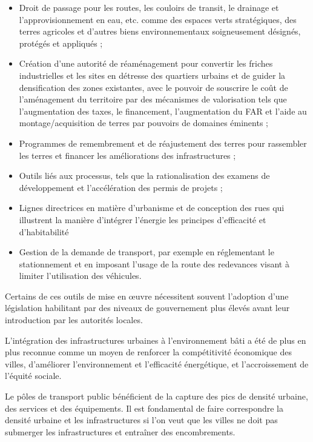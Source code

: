 \begin{itemize}
\item Droit de passage pour les routes, les couloirs de transit, le drainage et l'approvisionnement en eau, etc.
comme des espaces verts stratégiques, des terres agricoles et d'autres biens environnementaux soigneusement
désignés, protégés et appliqués ;
\item Création d'une autorité de réaménagement pour convertir les friches industrielles et les sites en détresse
des quartiers urbains et de guider la densification des zones existantes, avec le pouvoir de souscrire
le coût de l'aménagement du territoire par des mécanismes de valorisation tels que l'augmentation des taxes,
le financement, l'augmentation du FAR et l'aide au montage/acquisition de terres par
pouvoirs de domaines éminents ;
\item Programmes de remembrement et de réajustement des terres pour rassembler les terres et financer les
améliorations des infrastructures ;
\item Outils liés aux processus, tels que la rationalisation des examens de développement et l'accélération
des permis de projets ;
\item Lignes directrices en matière d'urbanisme et de conception des rues qui illustrent la manière d'intégrer l'énergie
les principes d'efficacité et d'habitabilité
\item Gestion de la demande de transport, par exemple en réglementant le stationnement et en imposant l'usage de la route
des redevances visant à limiter l'utilisation des véhicules.

\end{itemize}

Certains de ces outils de mise en œuvre nécessitent souvent l'adoption d'une législation habilitant par
des niveaux de gouvernement plus élevés avant leur introduction par les autorités locales.

L'intégration des infrastructures urbaines à l'environnement bâti a été de plus en plus
reconnue comme un moyen de renforcer la compétitivité économique des villes, d'améliorer
l'environnement et l'efficacité énergétique, et l'accroissement de l'équité sociale.

Le pôles de transport public bénéficient de la capture des pics de densité urbaine,
des services et des équipements. Il est fondamental de faire correspondre la densité urbaine et
les infrastructures si l'on veut que les villes ne doit pas submerger les infrastructures
et entraîner des encombrements.

